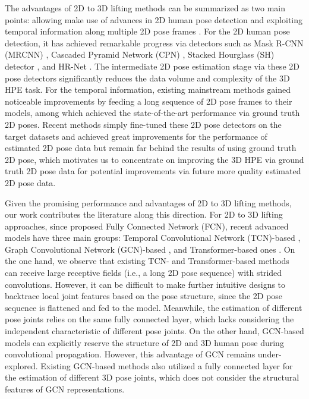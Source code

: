 \documentclass[10pt,twocolumn,letterpaper]{article}
\begin{document}
The advantages of 2D to 3D lifting methods can be summarized as two main points: allowing make use of advances in 2D human pose detection and exploiting temporal information along multiple 2D pose frames \cite{RN012,ji2020survey}. For the 2D human pose detection, it has achieved remarkable progress via detectors such as Mask R-CNN (MRCNN) \cite{RN004}, Cascaded Pyramid Network (CPN) \cite{RN005}, Stacked Hourglass (SH) detector \cite{RN003},  and HR-Net \cite{sun2019deep}. The intermediate 2D pose estimation stage via these 2D pose detectors significantly reduces the data volume and complexity of the 3D HPE task. For the temporal information, existing mainstream methods \cite{RN012,RN013,RN014, hu2021conditional, li2022exploiting, zhang2022mixste} gained noticeable improvements by feeding a long sequence of 2D pose frames to their models, among which \cite{zhang2022mixste} achieved the state-of-the-art performance via ground truth 2D poses. Recent methods \cite{zhang2022mixste, motionbert2022} simply fine-tuned these 2D pose detectors on the target datasets and achieved great improvements for the performance of estimated 2D pose data but remain far behind the results of using ground truth 2D pose, which motivates us to concentrate on improving the 3D HPE via ground truth 2D pose data for potential improvements via future more quality estimated 2D pose data.  

Given the promising performance and advantages of 2D to 3D lifting methods, our work contributes the literature along this direction. For 2D to 3D lifting approaches, since \cite{RN011} proposed Fully Connected Network (FCN), recent advanced models have three main groups: Temporal Convolutional Network (TCN)-based \cite{RN012,RN013},  Graph Convolutional Network (GCN)-based \cite{RN018,RN014, hu2021conditional}, and Transformer-based ones \cite{li2022mhformer, li2022exploiting, zhang2022mixste}. 
On the one hand, we observe that existing TCN- and Transformer-based methods can receive large receptive fields (i.e., a long 2D pose sequence) with strided convolutions. However, it can be difficult to make further intuitive designs to backtrace local joint features based on the pose structure, since the 2D pose sequence is flattened and fed to the model. Meanwhile, the estimation of different pose joints relies on the same fully connected layer, which lacks considering the independent characteristic of different pose joints. On the other hand, GCN-based models can explicitly reserve the structure of 2D and 3D human pose during convolutional propagation. However, this advantage of GCN remains under-explored. Existing GCN-based methods \cite{RN018,RN014} also utilized a fully connected layer for the estimation of different 3D pose joints, which does not consider the structural features of GCN representations. 
\end{document}
